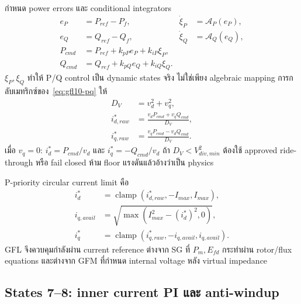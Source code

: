 \documentclass[12pt,a4paper]{article}
\newcommand{\clamp}{\operatorname{clamp}}
\begin{document}
กำหนด power errors และ conditional integrators
\begin{align}
e_P&=P_{ref}-P_f,&\dot\xi_P&=\mathcal A_P(e_P),\\
e_Q&=Q_{ref}-Q_f,&\dot\xi_Q&=\mathcal A_Q(e_Q),\\
P_{cmd}&=P_{ref}+k_{pP}e_P+k_{iP}\xi_P,\\
Q_{cmd}&=Q_{ref}+k_{pQ}e_Q+k_{iQ}\xi_Q.
\label{eq:gfl10-outer}
\end{align}
$\xi_P,\xi_Q$ ทำให้ P/Q control เป็น dynamic states จริง ไม่ใช่เพียง algebraic
mapping การกลับเมทริกซ์ของ~\eqref{eq:gfl10-pq} ให้
\begin{align}
D_V&=v_d^2+v_q^2,\\
i_{d,raw}^*&=\frac{v_dP_{cmd}+v_qQ_{cmd}}{D_V},\\
i_{q,raw}^*&=\frac{v_qP_{cmd}-v_dQ_{cmd}}{D_V}.
\label{eq:gfl10-iref}
\end{align}
เมื่อ $v_q=0$: $i_d^*=P_{cmd}/v_d$ และ $i_q^*=-Q_{cmd}/v_d$
ถ้า $D_V<V_{div,min}^2$ ต้องใช้ approved ride-through หรือ fail closed ห้าม floor
แรงดันแล้วอ้างว่าเป็น physics

P-priority circular current limit คือ
\begin{align}
i_d^*&=\clamp(i_{d,raw}^*,-I_{max},I_{max}),\\
i_{q,avail}&=\sqrt{\max(I_{max}^2-(i_d^*)^2,0)},\\
i_q^*&=\clamp(i_{q,raw}^*,-i_{q,avail},i_{q,avail}).
\label{eq:gfl10-ilimit}
\end{align}
GFL จึงควบคุมกำลังผ่าน current reference ต่างจาก SG ที่ $P_m,E_{fd}$ กระทำผ่าน
rotor/flux equations และต่างจาก GFM ที่กำหนด internal voltage หลัง virtual impedance

\subsection{States 7--8: inner current PI และ anti-windup}
\end{document}
